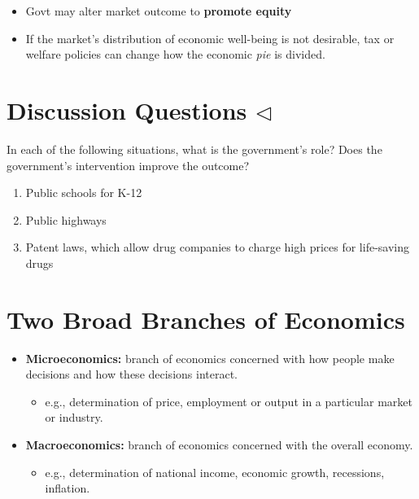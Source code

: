 \documentclass[
]{book}
\providecommand{\tightlist}{%
  \setlength{\itemsep}{0pt}\setlength{\parskip}{0pt}}
\begin{document}
\begin{itemize}
\item
  Govt may alter market outcome to \textbf{promote equity}
\item
  If the market's distribution of economic well-being is not desirable, tax or welfare policies can change how the economic \emph{pie} is divided.
\end{itemize}

\hypertarget{discussion-questions-triangleleft}{%
\section{\texorpdfstring{Discussion Questions \(\triangleleft\)}{Discussion Questions \textbackslash triangleleft}}\label{discussion-questions-triangleleft}}

In each of the following situations, what is the government's role? Does the government's intervention improve the outcome?

\begin{enumerate}
\def\labelenumi{\alph{enumi}.}
\item
  Public schools for K-12
\item
  Public highways
\item
  Patent laws, which allow drug companies to charge high prices for life-saving drugs
\end{enumerate}

\hypertarget{two-broad-branches-of-economics}{%
\section{Two Broad Branches of Economics}\label{two-broad-branches-of-economics}}

\begin{itemize}
\tightlist
\item
  \textbf{Microeconomics:} branch of economics concerned with how people make decisions and how these decisions interact.

  \begin{itemize}
  \tightlist
  \item
    e.g., determination of price, employment or output in a particular market or industry.
  \end{itemize}
\item
  \textbf{Macroeconomics:} branch of economics concerned with the overall economy.

  \begin{itemize}
  \tightlist
  \item
    e.g., determination of national income, economic growth, recessions, inflation.
  \end{itemize}
\end{itemize}
\end{document}
